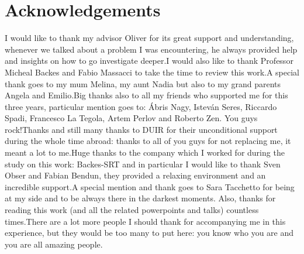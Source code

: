 \chapter*{Acknowledgements}
\thispagestyle{empty}

I would like to thank my advisor Oliver for its great support and understanding, whenever we talked about a problem I was encountering, he always provided help and insights on how to go investigate deeper.\newline I would also like to thank Professor Micheal Backes and Fabio Massacci to take the time to review this work.\newline A special thank goes to my mum Melina, my aunt Nadia but also to my grand parents Angela and Emilio.\newline Big thanks also to all my friends who supported me for this three years, particular mention goes to: \'Abris Nagy, Istev\'an Seres, Riccardo Spadi, Francesco La Tegola, Artem Perlov and Roberto Zen. You guys rock!\newline Thanks and still many thanks to DUIR for their unconditional support during the whole time abroad: thanks to all of you guys for not replacing me, it meant a lot to me.\newline Huge thanks to the company which I worked for during the study on this work: Backes-SRT and in particular I would like to thank Sven Obser and Fabian Bendun, they provided a relaxing environment and an incredible support.\newline A special mention and thank goes to Sara Tacchetto for being at my side and to be always there in the darkest moments. Also, thanks for reading this work (and all the related powerpoints and talks) countless times.\newline There are a lot more people I should thank for accompanying me in this experience, but they would be too many to put here: you know who you are and you are all amazing people.